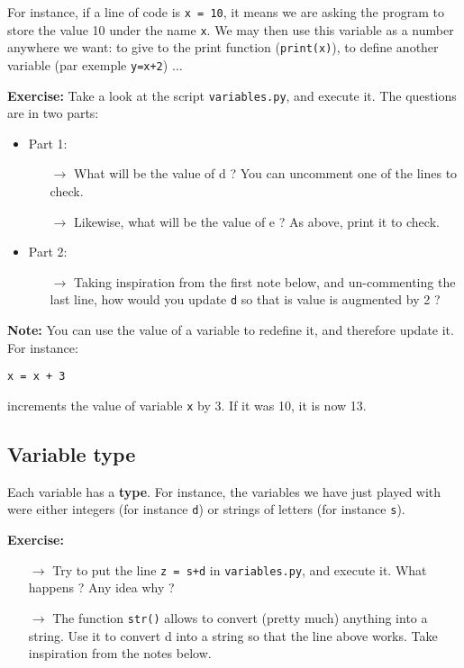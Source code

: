 \documentclass{article}
\newcommand{\note}[1]{
\begin{mdframed}[backgroundcolor=green!30!white]
\textbf{Note:} #1
\end{mdframed}
}
\newcommand{\exercise}[1]{
\begin{mdframed}[backgroundcolor=black!20!white]
\textbf{Exercise:} #1
\end{mdframed}
}
\begin{document}
For instance, if a line of code is \texttt{x = 10}, it means we are asking
the program to store the value 10 under the name \texttt{x}. We may then
use this variable as a number anywhere we want: to give to the print
function (\texttt{print(x)}), to define another variable (par exemple 
\texttt{y=x+2}) $\dots$

\exercise{
Take a look at the script \texttt{variables.py}, and execute it. The questions
are in two parts:
\begin{itemize}
\item Part 1:
\begin{itemize}
\item[$\rightarrow$] What will be the value of d ? You can uncomment one  
of the lines to check.
\item[$\rightarrow$] Likewise, what will be the value of e ? As above,
print it to check. 
\end{itemize}
\item Part 2:
\begin{itemize}
\item[$\rightarrow$] Taking inspiration from the first note below, and
un-commenting 
the last line, how would you update \texttt{d} so that is value is augmented
by 2 ? 
\end{itemize}
\end{itemize}
}

\note{
You can use the value of a variable to redefine it, and therefore
update it. For instance:
\begin{center}
\texttt{x = x + 3}
\end{center}
increments the value of variable \texttt{x} by 3. If it was 10, it is now 13.
}

\subsection{Variable type}

Each variable has a \textbf{type}. For instance, the variables we have
just played with were either integers (for instance \texttt{d})
or strings of letters (for instance \texttt{s}).

\exercise{
\begin{itemize}
\item[$\rightarrow$] Try to put the line \texttt{z = s+d} in \texttt{variables.py}, and execute it. What happens ?
Any idea why ?
\item[$\rightarrow$] The function \texttt{str()} allows to convert (pretty much) anything
into a string. Use it to convert d into a string so that the line above works.
Take inspiration from the notes below.
\end{itemize}
}
\end{document}
